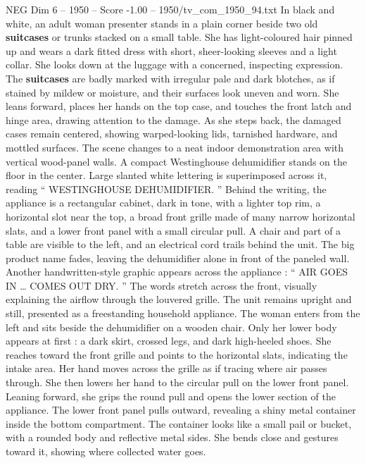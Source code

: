 \begin{textsample}{NEG Dim 6 – 1950 – Score -1.00 – 1950/tv\_com\_1950\_94.txt}  \label{ex:f6_neg_083}
In black and white, an adult woman presenter stands in a plain corner beside two old \textbf{suitcases} or trunks stacked on a small table.
She has light-coloured hair pinned up and wears a dark fitted dress with short, sheer-looking sleeves and a light collar.
She looks down at the luggage with a concerned, inspecting expression.
The \textbf{suitcases} are badly marked with irregular pale and dark blotches, as if stained by mildew or moisture, and their surfaces look uneven and worn.
She leans forward, places her hands on the top case, and touches the front latch and hinge area, drawing attention to the damage.
As she steps back, the damaged cases remain centered, showing warped-looking lids, tarnished hardware, and mottled surfaces.
The scene changes to a neat indoor demonstration area with vertical wood-panel walls.
A compact Westinghouse dehumidifier stands on the floor in the center.
Large slanted white lettering is superimposed across it, reading “ WESTINGHOUSE DEHUMIDIFIER. ” Behind the writing, the appliance is a rectangular cabinet, dark in tone, with a lighter top rim, a horizontal slot near the top, a broad front grille made of many narrow horizontal slats, and a lower front panel with a small circular pull.
A chair and part of a table are visible to the left, and an electrical cord trails behind the unit.
The big product name fades, leaving the dehumidifier alone in front of the paneled wall.
Another handwritten-style graphic appears across the appliance : “ AIR GOES IN … COMES OUT DRY. ” The words stretch across the front, visually explaining the airflow through the louvered grille.
The unit remains upright and still, presented as a freestanding household appliance.
The woman enters from the left and sits beside the dehumidifier on a wooden chair.
Only her lower body appears at first : a dark skirt, crossed legs, and dark high-heeled shoes.
She reaches toward the front grille and points to the horizontal slats, indicating the intake area.
Her hand moves across the grille as if tracing where air passes through.
She then lowers her hand to the circular pull on the lower front panel.
Leaning forward, she grips the round pull and opens the lower section of the appliance.
The lower front panel pulls outward, revealing a shiny metal container inside the bottom compartment.
The container looks like a small pail or bucket, with a rounded body and reflective metal sides.
She bends close and gestures toward it, showing where collected water goes.

\end{textsample}
